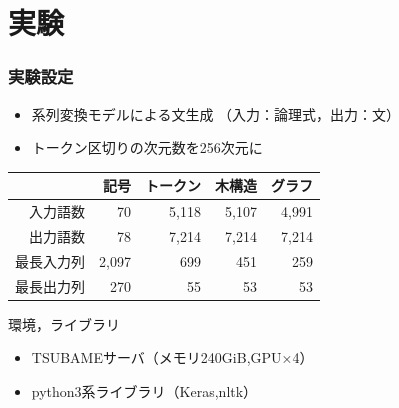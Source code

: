 \documentclass[dvipdfmx]{beamer}
\begin{document}
\section{実験}
\begin{frame}
\frametitle{実験設定}

\begin{itemize}
\item 系列変換モデルによる文生成 （入力：論理式，出力：文）
\item トークン区切りの次元数を256次元に
\end{itemize}

\begin{center}
  \begin{tabular}{rrrrr}
    \hline
    　  & 記号 & トークン & 木構造 & グラフ \\
    \hline \hline
    入力語数  & 70  &  5,118 & 5,107 & 4,991\\
    出力語数  & 78   & 7,214 & 7,214 & 7,214\\
    最長入力列 & 2,097  & 699 & 451 & 259 \\
    最長出力列 & 270  & 55 & 53 & 53 \\
    \hline
  \end{tabular}
\end{center}

\begin{block}{環境，ライブラリ}
\begin{itemize}
\item TSUBAMEサーバ（メモリ240GiB,GPU×4）
\item python3系ライブラリ（Keras,nltk）
\end{itemize}
\end{block}

\end{frame}
\end{document}
